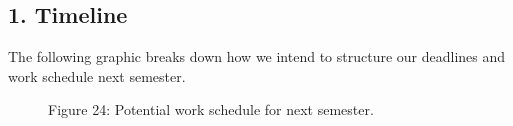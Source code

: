 ﻿\documentclass[10pt]{article}
\begin{document}
\subsection{1. Timeline}
The following graphic breaks down how we intend to structure our deadlines and work schedule next semester. 
%
%	
%
%	
%
%	 
%	
%
%	
%
%
%
%
%	         
%
%
%	
%
%	 
%	
%
%
%
%	 
%	
%
%
%
%	
%
%
%
%	
%
\begin{figure}
\caption{Figure 24: Potential work schedule for next semester.}
\label{fig:24}
\end{figure}
 
\end{document}

